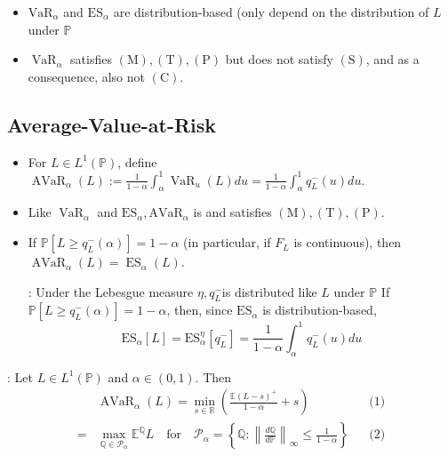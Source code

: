 \begin{itemize}[leftmargin=*]
    \item $\mathrm{VaR}_{\alpha}$ and $\mathrm{ES}_{\alpha}$ are distribution-based (only depend on the distribution of $L$ under $\mathbb{P}$
    \item $\operatorname{VaR}_{\alpha}$ satisfies $(\mathrm{M}),(\mathrm{T}),(\mathrm{P})$ but does not satisfy $(\mathrm{S})$, and as a consequence, also not $(\mathrm{C})$.
\end{itemize}




\subsection*{Average-Value-at-Risk}
\begin{itemize}[leftmargin=*]
    \item For $L \in L^{1}(\mathbb{P})$, define
$
\operatorname{AVaR}_{\alpha}(L):=\frac{1}{1-\alpha} \int_{\alpha}^{1} \operatorname{VaR}_{u}(L) d u=\frac{1}{1-\alpha} \int_{\alpha}^{1} q_{L}^{-}(u) d u
$.

    \item Like $\operatorname{VaR}_{\alpha}$ and $\mathrm{ES}_{\alpha}, \mathrm{AVaR}_{\alpha}$ is  and satisfies $(\mathrm{M}),(\mathrm{T}),(\mathrm{P})$.

    \item If $\mathbb{P}\left[L \geq q_{L}^{-}(\alpha)\right]=1-\alpha$ (in particular, if $F_{L}$ is continuous), then $\operatorname{AVaR}_{\alpha}(L)=\operatorname{ES}_{\alpha}(L)$.
    
    : Under the Lebesgue measure $\eta, q_{L}^{-}$is distributed like $L$ under $\mathbb{P}$ If $\mathbb{P}\left[L \geq q_{L}^{-}(\alpha)\right]=1-\alpha$, then, since $\mathrm{ES}_{\alpha}$ is distribution-based,
$$
\mathrm{ES}_{\alpha}[L]=\mathrm{ES}_{\alpha}^{\eta}\left[q_{L}^{-}\right]=\frac{1}{1-\alpha} \int_{\alpha}^{1} q_{L}^{-}(u) d u
$$
\end{itemize}

: Let $L \in L^{1}(\mathbb{P})$ and $\alpha \in(0,1)$. Then
$$
\begin{aligned}
&\operatorname{AVaR}_{\alpha}(L) =\min _{s \in \mathbb{R}}\left(\frac{\mathbb{E}(L-s)^{+}}{1-\alpha}+s\right)  && \text{(1)}\\
=&\max _{\mathbb{Q} \in \mathcal{P}_{\alpha}} \mathbb{E}^{\mathbb{Q}} L \quad \text {for} \quad \mathcal{P}_{\alpha}=\left\{\mathbb{Q}:\left\|\frac{d \mathbb{Q}}{d \mathbb{P}}\right\|_{\infty} \leq \frac{1}{1-\alpha}\right\} && \text{(2)}
\end{aligned}
$$

